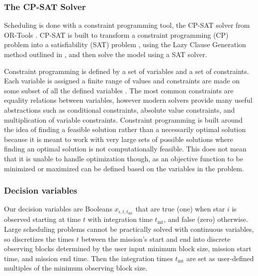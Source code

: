 \subsubsection{The CP-SAT Solver}

Scheduling is done with a constraint programming tool, the CP-SAT solver from
OR-Tools \citep{perronORTools2022}. CP-SAT is built to transform a constraint
programming (CP) problem into a satisfiability (SAT) problem
\citep{knuthSatisfiablility2018a}, using the Lazy Clause Generation method
outlined in \citet{feydyLazyClause2009a}, and then solve the model using a SAT
solver.


Constraint programming is defined by a set of variables and a set of
constraints. Each variable is assigned a finite range of values and constraints
are made on some subset of all the defined variables
\citep{shawConstraintProgramming2002}. The most common constraints are equality
relations between variables, however modern solvers provide many useful
abstractions such as conditional constraints, absolute value constraints, and
multiplication of variable constraints. Constraint programming is built around
the idea of finding a feasible solution rather than a necessarily optimal
solution because it is meant to work with very large sets of possible solutions
where finding an optimal solution is not computationally feasible. This does
not mean that it is unable to handle optimization though, as an objective
function to be minimized or maximized can be defined based on the variables in
the problem.





\subsubsection{Decision variables}

Our decision variables are Booleans $x_{i, t, t_{\textrm{int}}}$ that are true
(one) when star $i$ is observed starting at time $t$ with integration time
$t_{\textrm{int}}$, and false (zero) otherwise. Large scheduling problems
cannot be practically solved with continuous variables, so 
discretizes the times $t$ between the mission's start and end into discrete
observing blocks determined by the user input minimum block size, mission start
time, and mission end time. Then the integration times $t_{\textrm{int}}$ are
set as user-defined multiples of the minimum observing block size.

